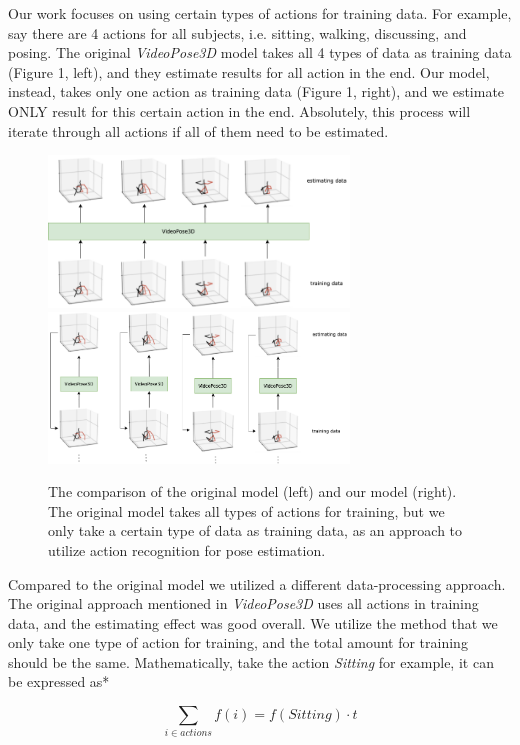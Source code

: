 \documentclass[10pt,twocolumn,letterpaper]{article}
\begin{document}
Our work focuses on using certain types of actions for training data. For example, say there are 4 actions for all
subjects, i.e. sitting, walking, discussing, and posing. The original \textit{VideoPose3D} model takes all 4 types
of data as training data (Figure 1, left), and they estimate results for all action in the end. Our model, instead, takes 
only one action as training data (Figure 1, right), and we estimate ONLY result for this certain action in the end. Absolutely, this
process will iterate through all actions if all of them need to be estimated.

\begin{figure}
\centering
\includegraphics[width=8cm]{model.png}
\includegraphics[width=8cm]{new_model.png}
\caption{The comparison of the original model (left) and our model (right). The original model takes all types of actions for 
		 training, but we only take a certain type of data as training data, as an approach to utilize action recognition for pose estimation.}
\label{fig:long}
\end{figure}

Compared to the original model we utilized a different data-processing approach. The original approach
mentioned in \textit{VideoPose3D} uses all actions in training data, and the estimating effect was good
overall. We utilize the method that we only take one type of action for training, and the total amount 
for training should be the same. Mathematically, take the action \textit{Sitting} for example, it can 
be expressed as*

\begin{equation}
	\sum_{i\in actions}{f(i)} = f(Sitting)\cdot t
\end{equation}
\end{document}
